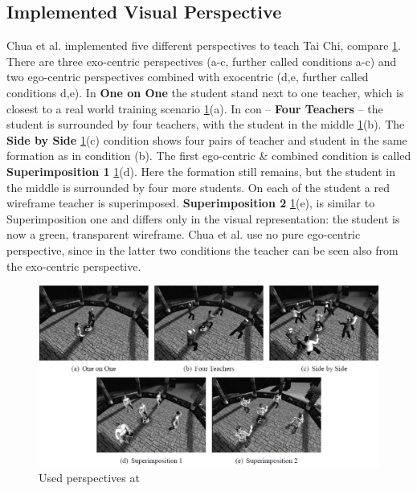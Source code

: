 \subsection{Implemented Visual Perspective}
Chua et al. \cite{chua} implemented five different perspectives to teach Tai Chi, compare \ref{fig:taichiperspectives}. There are three exo-centric perspectives (a-c, further called conditions a-c) and two ego-centric perspectives combined with exocentric (d,e, further called conditions d,e). In \textbf{One on One} the student stand next to one teacher, which is closest to a real world training scenario \ref{fig:taichiperspectives}(a). In con \--- \textbf{Four Teachers} \--- the student is surrounded by four teachers, with the student in the middle \ref{fig:taichiperspectives}(b). The \textbf{Side by Side} \ref{fig:taichiperspectives}(c) condition shows four pairs of teacher and student in the same formation as in condition (b). The first ego-centric \& combined condition is called \textbf{Superimposition 1} \ref{fig:taichiperspectives}(d). Here the formation still remains, but the student in the middle is surrounded by four more students. On each of the student a red wireframe teacher is superimposed. \textbf{Superimposition 2} \ref{fig:taichiperspectives}(e), is similar to Superimposition one and differs only in the visual representation: the student is now a green, transparent wireframe. Chua et al. use no pure ego-centric perspective, since in the latter two conditions the teacher can be seen also from the exo-centric perspective.
\begin{figure}
	\centering
	\includegraphics[width=1.0\textwidth]{img/taichi_perspectives.png}
	\caption{Used perspectives at \cite{Chua}}
	\label{fig:taichiperspectives}
\end{figure}\\
